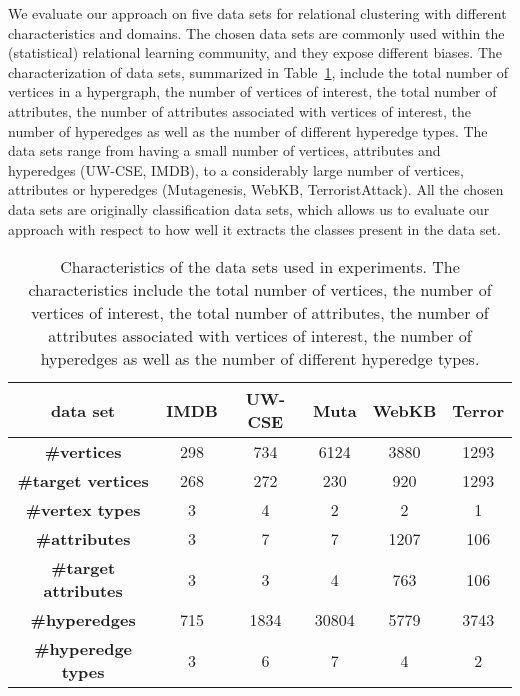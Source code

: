 We evaluate our approach on five data sets for relational clustering with different characteristics and domains.
The chosen data sets are commonly used within the (statistical) relational learning community, and they expose different biases. 
The characterization of data sets, summarized in Table~\ref{tab:Data}, include the total number of vertices in a hypergraph, the number of vertices of interest, the total number of attributes, the number of attributes associated with vertices of interest, the number of hyperedges as well as the number of different hyperedge types.
The data sets range from having a small number of vertices, attributes and hyperedges (UW-CSE, IMDB), to a considerably large number of vertices, attributes or hyperedges (Mutagenesis, WebKB, TerroristAttack).
All the chosen data sets are originally classification data sets, which allows us to evaluate our approach with respect to how well it extracts the classes present in the data set.
\vspace{2pt}



\begin{table}
\captionsetup{justification=justified}
\begin{center}
\caption{Characteristics of the data sets used in experiments. The characteristics include the total number of vertices, the number of vertices of interest, the total number of attributes, the number of attributes associated with vertices of interest, the number of hyperedges as well as the number of different hyperedge types.}
\label{tab:Data}
\begin{tabular}[t]{|c|c|c|c|c|c|}


		\hline
		\textbf{data set} & IMDB   & UW-CSE & Muta & WebKB & Terror \\
		\hline
		\textbf{\#vertices} & 298  & 734 & 6124 & 3880  & 1293\\
		\hline
		\textbf{\#target vertices} & 268 & 272  & 230 & 920  & 1293 \\
		\hline
		\textbf{\#vertex types} & 3  & 4 & 2  & 2  & 1 \\
		\hline
		\textbf{\#attributes}& 3   & 7 & 7 & 1207  & 106 \\
		\hline
		\textbf{\#target attributes} & 3  & 3 & 4 & 763  & 106\\
		\hline
		\textbf{\#hyperedges} & 715  & 1834 & 30804 & 5779  & 3743\\
		\hline
		\textbf{\#hyperedge types}  & 3   & 6 & 7 & 4 & 2 \\
		\hline
				

\end{tabular}
\end{center}

\end{table}


